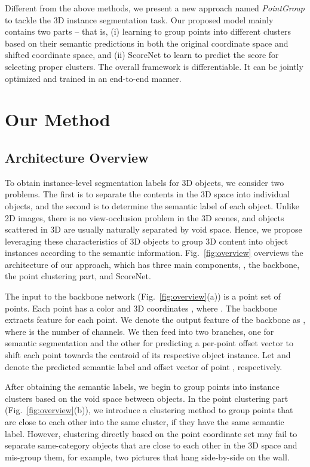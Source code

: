 \documentclass[10pt,twocolumn,letterpaper]{article}
\begin{document}
Different from the above methods, we present a new approach named {\em PointGroup} to tackle the 3D instance segmentation task. Our proposed model mainly contains two parts -- that is, (i) learning to group points into different clusters based on their semantic predictions in both the original coordinate space and shifted coordinate space, and (ii) ScoreNet to learn to predict the score for selecting proper clusters. The overall framework is differentiable. It can be jointly optimized and trained in an end-to-end manner.

\section{Our Method}





\subsection{Architecture Overview}
\label{sec:overview}
To obtain instance-level segmentation labels for 3D objects, we consider two problems.
The first is to separate the contents in the 3D space into individual objects, and the second is to determine the semantic label of each object.
Unlike 2D images, there is no view-occlusion problem in the 3D scenes, and objects scattered in 3D are usually naturally separated by void space.
Hence, we propose leveraging these characteristics of 3D objects to group 3D content into object instances according to the semantic information.
Fig.~\ref{fig:overview} overviews the architecture of our approach, which has three main components, \ie, the backbone, the point clustering part, and ScoreNet.

The input to the backbone network (Fig.~\ref{fig:overview}(a)) is a point set  of  points. 
Each point has a color  
and 3D coordinates , where .
The backbone extracts feature  for each point.
We denote the output feature of the backbone as , where  is the number of channels.
We then feed  into two branches, one for semantic segmentation and the other for predicting a per-point offset vector to shift each point towards the centroid of its respective object instance.
Let  and  denote the predicted semantic label and offset vector of point , respectively. 


After obtaining the semantic labels, we begin to group points into instance clusters based on the void space between objects. 
In the point clustering part (Fig.~\ref{fig:overview}(b)), we introduce a clustering method to group points that are close to each other into the same cluster, if they have the same semantic label.
However,  
clustering directly based on the point coordinate set  may fail to separate same-category objects that are close to each other in the 3D space and mis-group them, for example, two pictures that hang side-by-side on the wall.
\end{document}
